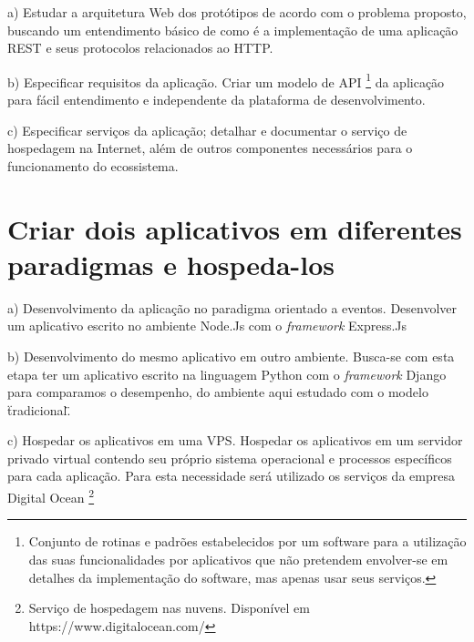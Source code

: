  \begin{compactitem}
    \item[a)] Estudar a arquitetura Web dos protótipos de acordo com o problema proposto, buscando um entendimento 
    básico de como é a implementação de uma aplicação \ac{REST} e seus protocolos relacionados ao HTTP.
    
    \item[b)] Especificar requisitos da aplicação. Criar um modelo de API 
    \footnote{Conjunto de rotinas e padrões estabelecidos por um software para a utilização das suas funcionalidades por
    aplicativos que não pretendem envolver-se em detalhes da implementação do software, mas apenas usar seus serviços.} 
    da aplicação para fácil entendimento e independente da plataforma de desenvolvimento.
    
    \item[c)] Especificar serviços da aplicação; detalhar e documentar o serviço de hospedagem na Internet, além de outros componentes 
    necessários para o funcionamento do ecossistema.
      
  \end{compactitem}

\section{Criar dois aplicativos em diferentes paradigmas e hospeda-los}
  
  \begin{compactitem}
    \item[a)] Desenvolvimento da aplicação no paradigma orientado a eventos. Desenvolver um aplicativo escrito no
    ambiente Node.Js com o \textit{framework} Express.Js
    
    \item[b)] Desenvolvimento do mesmo aplicativo em outro ambiente. Busca-se com esta etapa ter 
    um aplicativo escrito na linguagem Python com o \textit{framework} Django para comparamos o desempenho, 
    do ambiente aqui estudado com o modelo \"tradicional\".
    
    \item[c)] Hospedar os aplicativos em uma \ac{VPS}.  Hospedar os aplicativos em um 
    servidor privado virtual contendo seu próprio sistema operacional e processos
    específicos para cada aplicação. Para esta necessidade será utilizado os serviços da empresa Digital Ocean \footnote{
    Serviço de hospedagem nas nuvens. Disponível em https://www.digitalocean.com/}
    
  \end{compactitem}

